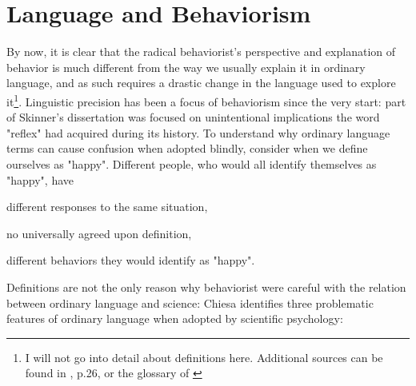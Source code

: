\documentclass[letterpaper,11pt,twocolumn]{article}
\begin{document}
\section*{Language and Behaviorism}
By now, it is clear that the radical behaviorist's perspective and explanation of behavior is much different from the way we usually explain it in ordinary language, and as such requires a drastic change in the language used to explore it\footnote{I will not go into detail about definitions here. Additional sources can be found in \cite{chiesaRadicalBehaviorismPhilosophy1994}, p.26, or the glossary of \cite{cooperAppliedBehaviorAnalysis2019}}. Linguistic precision has been a focus of behaviorism since the very start: part of Skinner's dissertation was focused on unintentional implications the word "reflex" had acquired during its history. To understand why ordinary language terms can cause confusion when adopted blindly, consider when we define ourselves as "happy". Different people, who would all identify themselves as "happy", have
\begin{inlinelist}
    \item different responses to the same situation,
    \item no universally agreed upon definition,
    \item different behaviors they would identify as "happy".
\end{inlinelist}
Definitions are not the only reason why behaviorist were careful with the relation between ordinary language and science: Chiesa\cite{chiesaRadicalBehaviorismPhilosophy1994} identifies three problematic features of ordinary language when adopted by scientific psychology:
\end{document}
